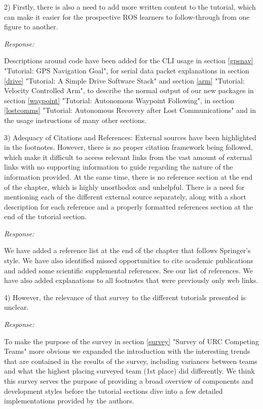 \documentclass[runningheads,a4paper]{llncs}
\newcommand{\rsp}{\noindent \textit{Response:}}
\begin{document}
2)  Firstly, there is also a need to add more written content to the tutorial, which can make it easier for the prospective ROS learners to follow-through from one figure to another.

\rsp

Descriptions around code have been added for the CLI usage in section \ref{gpsnav} "Tutorial: GPS Navigation Goal", for serial data packet explanations in section \ref{drive} "Tutorial: A Simple Drive Software Stack" and section \ref{arm} "Tutorial: Velocity Controlled Arm", to describe the normal output of our new packages in section \ref{waypoint} "Tutorial: Autonomous Waypoint Following", in section \ref{lostcomms} "Tutorial: Autonomous Recovery after Lost Communications" and in the usage instructions of many other sections.

3)  Adequacy of Citations and References: External sources have been highlighted in the footnotes. However, there is no proper citation framework being followed, which make it difficult to access relevant links from the vast amount of external links with no supporting information to guide regarding the nature of the information provided. At the same time, there is no reference section at the end of the chapter, which is highly unorthodox and unhelpful. There is a need for mentioning each of the different external source separately, along with a short description for each reference and a properly formatted references section at the end of the tutorial section.

\rsp

We have added a reference list at the end of the chapter that follows Springer's style. We have also identified missed opportunities to cite academic publications and added some scientific supplemental references. See our list of references. We have also added explanations to all footnotes that were previously only web links.

4)  However, the relevance of that survey to the different tutorials presented is unclear.

\rsp

To make the purpose of the survey in section \ref{survey} "Survey of URC Competing Teams" more obvious we expanded the introduction with the interesting trends that are contained in the results of the survey, including variances between teams and what the highest placing surveyed team (1st place) did differently. We think this survey serves the purpose of providing a broad overview of components and development styles before the tutorial sections dive into a few detailed implementations provided by the authors.
\end{document}
